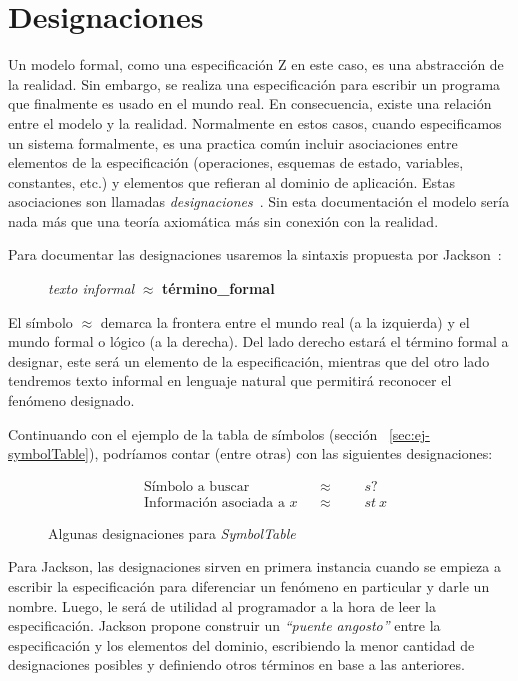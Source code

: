 \section{Designaciones}
\label{cap:designaciones}

Un modelo formal, como una especificación Z en este caso, es una abstracción de la realidad. Sin embargo, se realiza una especificación para escribir un programa que finalmente es usado en el mundo real. En consecuencia, existe una relación entre el modelo y la realidad.
Normalmente en estos casos, cuando especificamos un sistema formalmente, es una practica común incluir asociaciones entre elementos de la especificación (operaciones, esquemas de estado, variables, constantes, etc.) y elementos que refieran al dominio de aplicación. Estas asociaciones son llamadas \emph{designaciones}~\cite{jackson}.
Sin esta documentación el modelo sería nada más que una teoría axiomática más sin conexión con la realidad. 

Para documentar las designaciones usaremos la sintaxis propuesta por Jackson~\cite{jackson}:

\begin{figure}[H]
  \centering
  \emph{texto informal} $\approx$ \textbf{término\_formal}
\end{figure}

El símbolo $\approx$ demarca la frontera entre el mundo real (a la izquierda) y el mundo formal o lógico (a la derecha). Del lado derecho estará el término formal a designar, este será un elemento de la especificación, mientras que del otro lado tendremos texto informal en lenguaje natural que permitirá reconocer el fenómeno designado.

Continuando con el ejemplo de la tabla de símbolos (sección ~\ref{sec:ej-symbolTable}), podríamos contar (entre otras) con las siguientes designaciones:

\begin{figure}[H]
  \begin{align*} 
    &\text{Símbolo a buscar} && \approx &&&s? \\
    &\text{Información asociada a $x$} && \approx &&&st~x
  \end{align*}
  \caption{Algunas designaciones para \emph{SymbolTable}}
  \label{fig:ej_designacion}
\end{figure}


Para Jackson, las designaciones sirven en primera instancia cuando se empieza a escribir la especificación para diferenciar un fenómeno en particular y darle un nombre. Luego, le será de utilidad al programador a la hora de leer la especificación. Jackson propone construir un \emph{``puente angosto''} entre la especificación y los elementos del dominio, escribiendo la menor cantidad de designaciones posibles y definiendo otros términos en base a las anteriores.



